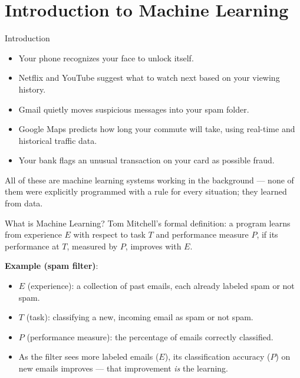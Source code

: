 \section{Introduction to Machine Learning}

\begin{frame}{Introduction}
	\begin{itemize}
		\item Your phone recognizes your face to unlock itself.
		\item Netflix and YouTube suggest what to watch next based on your viewing history.
		\item Gmail quietly moves suspicious messages into your spam folder.
		\item Google Maps predicts how long your commute will take, using real-time and historical traffic data.
		\item Your bank flags an unusual transaction on your card as possible fraud.
	\end{itemize}

	\vspace{0.5em}
	All of these are machine learning systems working in the background --- none of them were explicitly programmed with a rule for every situation; they learned from data.
\end{frame}


\begin{frame}{What is Machine Learning?}
	Tom Mitchell's formal definition: a program learns from experience $E$ with respect to task $T$ and performance measure $P$, if its performance at $T$, measured by $P$, improves with $E$.

	\vspace{0.4em}
	\textbf{Example (spam filter)}:
	\begin{itemize}
		\item $E$ (experience): a collection of past emails, each already labeled spam or not spam.
		\item $T$ (task): classifying a new, incoming email as spam or not spam.
		\item $P$ (performance measure): the percentage of emails correctly classified.
		\item As the filter sees more labeled emails ($E$), its classification accuracy ($P$) on new emails improves --- that improvement \emph{is} the learning.
	\end{itemize}
\end{frame}


